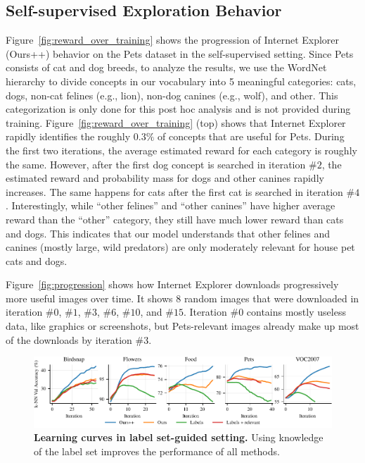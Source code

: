 \subsection{Self-supervised Exploration Behavior}
Figure~\ref{fig:reward_over_training} shows the progression of Internet Explorer (Ours++) behavior on the Pets dataset in the self-supervised setting. Since Pets consists of cat and dog breeds, to analyze the results, we use the WordNet hierarchy to divide concepts in our vocabulary into 5 meaningful categories: cats, dogs, non-cat felines (e.g., lion), non-dog canines (e.g., wolf), and other. This categorization is only done for this post hoc analysis and is not provided during training. Figure~\ref{fig:reward_over_training} (top) shows that
Internet Explorer rapidly identifies the roughly $0.3\%$ of concepts that are useful for Pets. During the first two iterations, the average estimated reward for each category is roughly the same. However, after the first dog concept is searched in iteration $\#2$, the estimated reward and probability mass for dogs and other canines rapidly increases. The same happens for cats after the first cat is searched in iteration $\#4$. Interestingly, while ``other felines'' and ``other canines''  have higher average reward than the ``other'' category, they still have much lower reward than cats and dogs. This indicates that our model understands that other felines and canines (mostly large, wild predators) are only moderately relevant for house pet cats and dogs. 

Figure~\ref{fig:progression} shows how Internet Explorer downloads progressively more useful images over time. It shows 8 random images that were downloaded in iteration $\#0$, $\#1$, $\#3$, $\#6$, $\#10$, and $\#15$. Iteration $\#0$ contains mostly useless data, like graphics or screenshots, but Pets-relevant images already make up most of the downloads by iteration $\#3$. 


\begin{figure}[t]
    \centering
    \includegraphics[width=\linewidth]{figures/semisup-curves-updated.pdf}
    \vspace{-0.3in}
    \caption{\textbf{Learning curves in label set-guided setting.} Using knowledge of the label set improves the performance of all methods. }
    \label{fig:semisup_learning_curves}
\end{figure}


